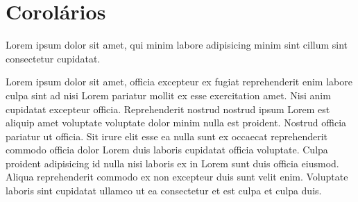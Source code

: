 \documentclass[12pt]{../libellum}
\begin{document}
  \section{Corolários}


  Lorem ipsum dolor sit amet, qui minim labore adipisicing minim sint cillum sint consectetur cupidatat.



  Lorem ipsum dolor sit amet, officia excepteur ex fugiat reprehenderit enim labore culpa sint ad nisi Lorem pariatur mollit ex esse exercitation amet. Nisi anim cupidatat excepteur officia. Reprehenderit nostrud nostrud ipsum Lorem est aliquip amet voluptate voluptate dolor minim nulla est proident. Nostrud officia pariatur ut officia. Sit irure elit esse ea nulla sunt ex occaecat reprehenderit commodo officia dolor Lorem duis laboris cupidatat officia voluptate. Culpa proident adipisicing id nulla nisi laboris ex in Lorem sunt duis officia eiusmod. Aliqua reprehenderit commodo ex non excepteur duis sunt velit enim. Voluptate laboris sint cupidatat ullamco ut ea consectetur et est culpa et culpa duis.

\end{document}
